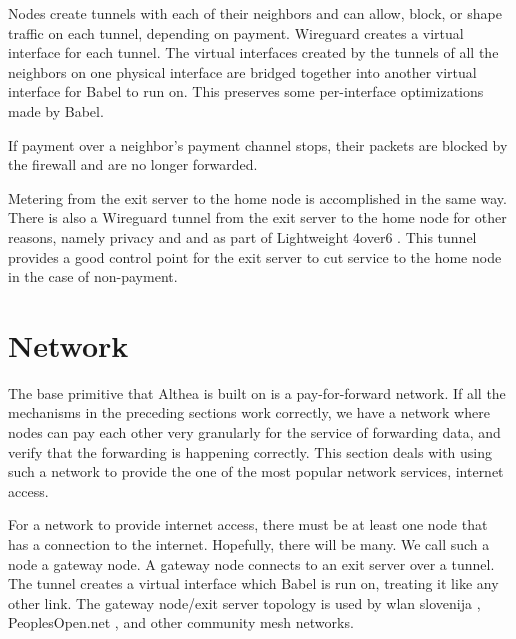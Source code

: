 \documentclass[11pt]{article}
\begin{document}
Nodes create tunnels with each of their neighbors and can allow, block, or shape traffic on each tunnel, depending on payment. Wireguard creates a virtual interface for each tunnel. The virtual interfaces created by the tunnels of all the neighbors on one physical interface are bridged together into another virtual interface for Babel to run on. This preserves some per-interface optimizations made by Babel.

If payment over a neighbor’s payment channel stops, their packets are blocked by the firewall and are no longer forwarded.

Metering from the exit server to the home node is accomplished in the same way. There is also a Wireguard tunnel from the exit server to the home node for other reasons, namely privacy and and as part of Lightweight 4over6 \cite{4over6}. This tunnel provides a good control point for the exit server to cut service to the home node in the case of non-payment. 

\section{Network}
\label{sec:network}
The base primitive that Althea is built on is a pay-for-forward network. If all the mechanisms in the preceding sections work correctly, we have a network where nodes can pay each other very granularly for the service of forwarding data, and verify that the forwarding is happening correctly. This section deals with using such a network to provide the one of the most popular network services, internet access.

\begin{figure}[h]
\end{figure}

For a network to provide internet access, there must be at least one node that has a connection to the internet. Hopefully, there will be many. We call such a node a gateway node. A gateway node connects to an exit server over a tunnel. The tunnel creates a virtual interface which Babel is run on, treating it like any other link. The gateway node/exit server topology \cite{exittopology} is used by wlan slovenija \cite{wlanslovenija}, PeoplesOpen.net \cite{pplsopen}, and other community mesh networks.
\end{document}
